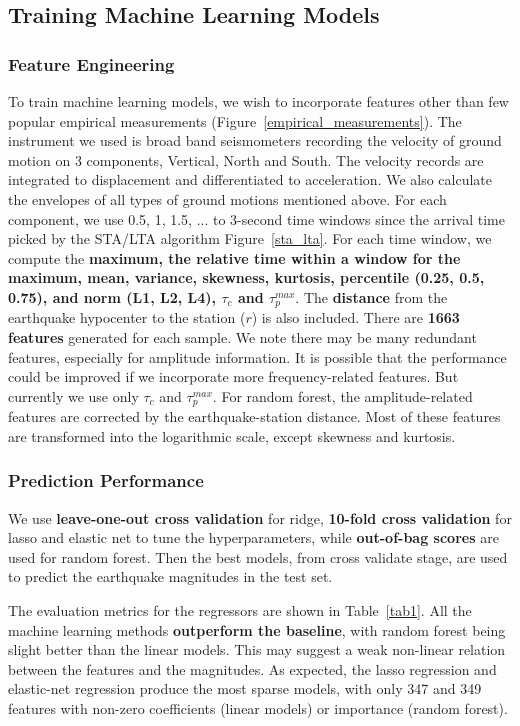 \documentclass{article} %
\begin{document}
\subsection{Training Machine Learning Models}

\subsubsection{Feature Engineering}
To train machine learning models, we wish to incorporate features other than few popular empirical measurements (Figure~\ref{empirical_measurements}). The instrument we used is broad band seismometers recording the velocity of ground motion on 3 components, Vertical, North and South. The velocity records are integrated to displacement and differentiated to acceleration. We also calculate the envelopes of all types of ground motions mentioned above. For each component, we use 0.5, 1, 1.5, ... to 3-second time windows since the arrival time picked by the STA/LTA algorithm Figure~\ref{sta_lta}. For each time window, we compute the \textbf{maximum, the relative time within a window for the maximum, mean, variance, skewness, kurtosis, percentile (0.25, 0.5, 0.75), and norm (L1, L2, L4), $\tau_c$ and $\tau_p^{max}$}. The \textbf{distance} from the earthquake hypocenter to the station ($r$) is also included. There are \textbf{1663 features} generated for each sample. We note there may be many redundant features, especially for amplitude information. It is possible that the performance could be improved if we incorporate more frequency-related features. But currently we use only $\tau_c$ and $\tau_p^{max}$. For random forest, the amplitude-related features are corrected by the earthquake-station distance. Most of these features are transformed into the logarithmic scale, except skewness and kurtosis.

\subsubsection{Prediction Performance}
We use \textbf{leave-one-out cross validation} for ridge, \textbf{10-fold cross validation} for lasso and elastic net to tune the hyperparameters, while \textbf{out-of-bag scores} are used for random forest. Then the best models, from cross validate stage,  are used to predict the earthquake magnitudes in the test set.

The evaluation metrics for the regressors are shown in Table~\ref{tab1}. All the machine learning methods \textbf{outperform the baseline}, with random forest being slight better than the linear models. This may suggest a weak non-linear relation between the features and the magnitudes. As expected, the lasso regression and elastic-net regression produce the most sparse models, with only 347 and 349 features with non-zero coefficients (linear models) or importance (random forest).   
\end{document}
